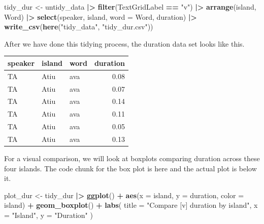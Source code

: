 \documentclass[
  ,man,floatsintext]{apa6}
\newenvironment{Shaded}{\begin{snugshade}}{\end{snugshade}}
\newcommand{\AttributeTok}[1]{\textcolor[rgb]{0.13,0.29,0.53}{#1}}
\newcommand{\FunctionTok}[1]{\textcolor[rgb]{0.13,0.29,0.53}{\textbf{#1}}}
\newcommand{\NormalTok}[1]{#1}
\newcommand{\OtherTok}[1]{\textcolor[rgb]{0.56,0.35,0.01}{#1}}
\newcommand{\SpecialCharTok}[1]{\textcolor[rgb]{0.81,0.36,0.00}{\textbf{#1}}}
\newcommand{\StringTok}[1]{\textcolor[rgb]{0.31,0.60,0.02}{#1}}
\begin{document}
\begin{Shaded}
\begin{Highlighting}[]
\NormalTok{tidy\_dur }\OtherTok{\textless{}{-}}\NormalTok{ untidy\_data }\SpecialCharTok{|\textgreater{}}
  \FunctionTok{filter}\NormalTok{(TextGridLabel }\SpecialCharTok{==} \StringTok{"v"}\NormalTok{) }\SpecialCharTok{|\textgreater{}}  
  \FunctionTok{arrange}\NormalTok{(island, Word) }\SpecialCharTok{|\textgreater{}}  
  \FunctionTok{select}\NormalTok{(speaker, island, }\AttributeTok{word =}\NormalTok{ Word, duration) }\SpecialCharTok{|\textgreater{}}
  \FunctionTok{write\_csv}\NormalTok{(}\FunctionTok{here}\NormalTok{(}\StringTok{"tidy\_data"}\NormalTok{, }\StringTok{"tidy\_dur.csv"}\NormalTok{))}
\end{Highlighting}
\end{Shaded}

After we have done this tidying process, the duration data set looks like this.

\begin{tabular}{l|l|l|r}
\hline
speaker & island & word & duration\\
\hline
TA & Atiu & ava & 0.08\\
\hline
TA & Atiu & ava & 0.07\\
\hline
TA & Atiu & ava & 0.14\\
\hline
TA & Atiu & ava & 0.11\\
\hline
TA & Atiu & ava & 0.05\\
\hline
TA & Atiu & ava & 0.13\\
\hline
\end{tabular}

For a visual comparison, we will look at boxplots comparing duration across these four islands. The code chunk for the box plot is here and the actual plot is below it.

\begin{Shaded}
\begin{Highlighting}[]
\NormalTok{plot\_dur }\OtherTok{\textless{}{-}}\NormalTok{ tidy\_dur }\SpecialCharTok{|\textgreater{}}
  \FunctionTok{ggplot}\NormalTok{() }\SpecialCharTok{+}
  \FunctionTok{aes}\NormalTok{(}\AttributeTok{x =}\NormalTok{ island, }\AttributeTok{y =}\NormalTok{ duration, }\AttributeTok{color =}\NormalTok{ island) }\SpecialCharTok{+}
  \FunctionTok{geom\_boxplot}\NormalTok{() }\SpecialCharTok{+}
  \FunctionTok{labs}\NormalTok{(}
    \AttributeTok{title =} \StringTok{"Compare [v] duration by island"}\NormalTok{,}
    \AttributeTok{x =} \StringTok{"Island"}\NormalTok{,}
    \AttributeTok{y =} \StringTok{"Duration"}
\NormalTok{  )}
\end{Highlighting}
\end{Shaded}
\end{document}
